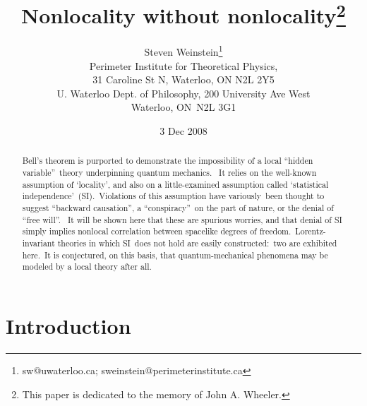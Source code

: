 \documentclass[12pt]{article}%
\begin{document}
\title{Nonlocality without nonlocality\thanks{This paper is dedicated to the memory
of John A. Wheeler.}}
\author{Steven Weinstein\thanks{sw@uwaterloo.ca; sweinstein@perimeterinstitute.ca}\\
\normalsize Perimeter Institute for Theoretical Physics,\\
\normalsize 31 Caroline St N, Waterloo, ON N2L 2Y5\\
\normalsize U. Waterloo Dept. of Philosophy, 200 University Ave West\\
\normalsize Waterloo, ON\ N2L 3G1}
\date{ 3 Dec 2008}
\maketitle

\begin{abstract}
Bell's theorem is purported to demonstrate the impossibility of a local
\textquotedblleft hidden variable\textquotedblright\ theory underpinning
quantum mechanics. \ It relies on the well-known assumption of `locality', and
also on a little-examined assumption called `statistical
independence'\ (SI).\ Violations of this assumption have variously\ been
thought to suggest \textquotedblleft backward causation\textquotedblright, a
\textquotedblleft conspiracy\textquotedblright\ on the part of nature, or the
denial of \textquotedblleft free will\textquotedblright. \ It will be shown
here that these are spurious worries, and that denial of SI simply implies
nonlocal correlation between spacelike degrees of freedom.\ Lorentz-invariant
theories in which SI\ does not hold are easily constructed:\ two are exhibited
here.\ It is conjectured, on this basis, that quantum-mechanical phenomena may
be modeled by a local theory after all.

\end{abstract}
\newpage

\section{Introduction}
\end{document}
